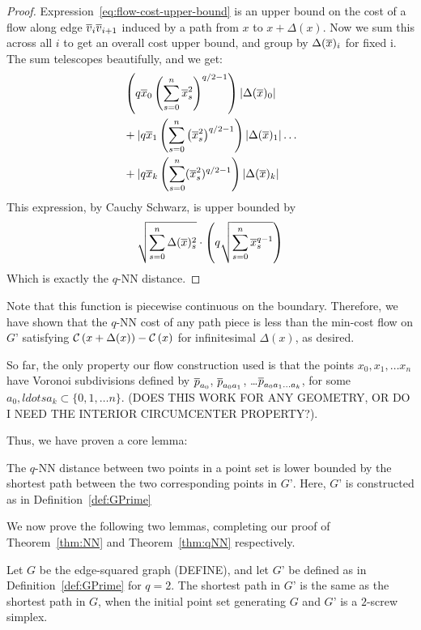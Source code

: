 \begin{proof}
Expression~\ref{eq:flow-cost-upper-bound} is an upper bound on the cost of
a flow along edge $\overline{v}_i\overline{v}_{i+1}$ induced by a path from $x$ to $x+\Delta(x)$. Now we sum this across all $i$ to get an overall cost upper bound, and group by
$\Delta(\overline{x})_i$ for fixed i. The sum telescopes beautifully, and we get:
\begin{align}
&\left(q\overline{x}_0\left(\sum_{s=0}^n \overline{x}_s^2\right)^{q/2-1}\right)| \Delta(\overline{x})_0|
\\&+
|q\overline{x}_1\left(\sum_{s=0}^n \left(\overline{x}_s^2\right)^{q/2-1}\right)| \Delta(\overline{x})_1|
\ldots
\\& +
|q\overline{x}_k\left(\sum_{s=0}^n (\overline{x}_s^2)^{q/2-1}\right)| \Delta(\overline{x})_k|
\end{align}
This expression, by Cauchy Schwarz, is upper bounded by
\[
\sqrt{\sum_{s=0}^n \Delta(\overline{x})_s^2} \cdot \left(q\sqrt{\sum_{s=0}^n
\overline{x}_s^{q-1}}\right)
\]
Which is exactly the $q$-NN distance.

\end{proof}

Note that this function is piecewise continuous on the boundary. Therefore,
we have shown that the $q$-NN cost of any path piece is less than the
min-cost flow on $G’$ satisfying
$\mathcal{C}\left(x+\Delta(x)\right)-\mathcal{C}\left(x\right)$ for infinitesimal
$\Delta(x)$, as desired.

So far, the only property our flow construction used is that the points
$x_0, x_1, \ldots x_n$ have Voronoi subdivisions defined by $\overline{p}_{a_0}$,
$\overline{p}_{a_0a_1}$, \ldots $\overline{p}_{a_0a_1\ldots a_k}$, for some $a_0, ldots a_k
\subset \{0, 1, \ldots n\}$. (DOES THIS WORK FOR ANY GEOMETRY, OR DO I NEED
THE INTERIOR CIRCUMCENTER PROPERTY?).

Thus, we have proven a core lemma:

\begin{lemma}\label{lem:qNN-GPrime}

The $q$-NN distance between two points in a point set is lower bounded by
the shortest path between the two corresponding points in $G’$. Here, $G’$
is constructed as in Definition~\ref{def:GPrime}

\end{lemma}

We now prove the following two lemmas, completing our proof of
Theorem~\ref{thm:NN} and Theorem~\ref{thm:qNN} respectively.

\begin{lemma}\label{lem:edge-squared-GPrime} Let $G$ be the edge-squared graph
(DEFINE), and let $G’$ be defined as in Definition~\ref{def:GPrime} for $q=2$.
The shortest path in $G’$ is the same as the shortest path in $G$, when the
initial point set generating $G$ and $G’$ is a $2$-screw simplex.

\end{lemma}

